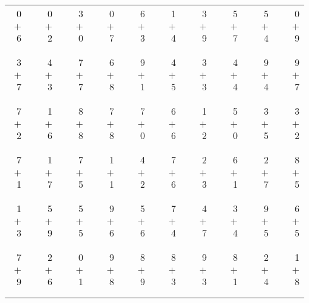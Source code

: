 \documentclass[12pt, letterpaper]{article}
\begin{document}
\begin{tabular}{rrrrrrrrrrrrrrrrrrr}
0 & & 0 & & 3 & & 0 & & 6 & & 1 & & 3 & & 5 & & 5 & & 0\\
$+$ 6 & & $+$ 2 & & $+$ 0 & & $+$ 7 & & $+$ 3 & & $+$ 4 & & $+$ 9 & & $+$ 7 & & $+$ 4 & & $+$ 9\\
\cline{1-1} \cline{3-3} \cline{5-5} \cline{7-7} \cline{9-9} \cline{11-11} \cline{13-13} \cline{15-15} \cline{17-17} \cline{19-19} \\ \\
3 & & 4 & & 7 & & 6 & & 9 & & 4 & & 3 & & 4 & & 9 & & 9\\
$+$ 7 & & $+$ 3 & & $+$ 7 & & $+$ 8 & & $+$ 1 & & $+$ 5 & & $+$ 3 & & $+$ 4 & & $+$ 4 & & $+$ 7\\
\cline{1-1} \cline{3-3} \cline{5-5} \cline{7-7} \cline{9-9} \cline{11-11} \cline{13-13} \cline{15-15} \cline{17-17} \cline{19-19} \\ \\
7 & & 1 & & 8 & & 7 & & 7 & & 6 & & 1 & & 5 & & 3 & & 3\\
$+$ 2 & & $+$ 6 & & $+$ 8 & & $+$ 8 & & $+$ 0 & & $+$ 6 & & $+$ 2 & & $+$ 0 & & $+$ 5 & & $+$ 2\\
\cline{1-1} \cline{3-3} \cline{5-5} \cline{7-7} \cline{9-9} \cline{11-11} \cline{13-13} \cline{15-15} \cline{17-17} \cline{19-19} \\ \\
7 & & 1 & & 7 & & 1 & & 4 & & 7 & & 2 & & 6 & & 2 & & 8\\
$+$ 1 & & $+$ 7 & & $+$ 5 & & $+$ 1 & & $+$ 2 & & $+$ 6 & & $+$ 3 & & $+$ 1 & & $+$ 7 & & $+$ 5\\
\cline{1-1} \cline{3-3} \cline{5-5} \cline{7-7} \cline{9-9} \cline{11-11} \cline{13-13} \cline{15-15} \cline{17-17} \cline{19-19} \\ \\
1 & & 5 & & 5 & & 9 & & 5 & & 7 & & 4 & & 3 & & 9 & & 6\\
$+$ 3 & & $+$ 9 & & $+$ 5 & & $+$ 6 & & $+$ 6 & & $+$ 4 & & $+$ 7 & & $+$ 4 & & $+$ 5 & & $+$ 5\\
\cline{1-1} \cline{3-3} \cline{5-5} \cline{7-7} \cline{9-9} \cline{11-11} \cline{13-13} \cline{15-15} \cline{17-17} \cline{19-19} \\ \\
7 & & 2 & & 0 & & 9 & & 8 & & 8 & & 9 & & 8 & & 2 & & 1\\
$+$ 9 & & $+$ 6 & & $+$ 1 & & $+$ 8 & & $+$ 9 & & $+$ 3 & & $+$ 3 & & $+$ 1 & & $+$ 4 & & $+$ 8\\
\cline{1-1} \cline{3-3} \cline{5-5} \cline{7-7} \cline{9-9} \cline{11-11} \cline{13-13} \cline{15-15} \cline{17-17} \cline{19-19} \\ \\

\end{tabular}
\end{document}
